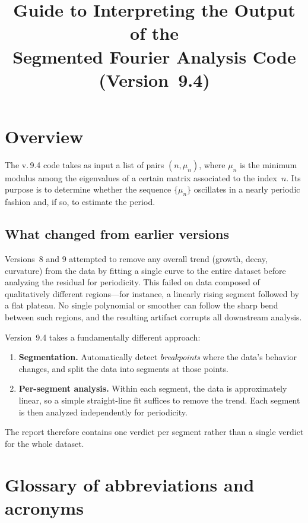 \documentclass[11pt]{article}
\title{Guide to Interpreting the Output of the\\
Segmented Fourier Analysis Code (Version~9.4)}
\author{}
\date{}
\begin{document}
\maketitle

\section{Overview}

The v.\,9.4 code takes as input a list of pairs $(n, \mu_n)$, where
$\mu_n$ is the minimum modulus among the eigenvalues of a certain matrix
associated to the index~$n$.  Its purpose is to determine whether the
sequence $\{\mu_n\}$ oscillates in a nearly periodic fashion and, if so,
to estimate the period.

\subsection*{What changed from earlier versions}

Versions~8 and 9 attempted to remove any overall trend (growth, decay,
curvature) from the data by fitting a single curve to the entire dataset
before analyzing the residual for periodicity.  This failed on data
composed of qualitatively different regions---for instance, a linearly
rising segment followed by a flat plateau.  No single polynomial or
smoother can follow the sharp bend between such regions, and the resulting
artifact corrupts all downstream analysis.

Version~9.4 takes a fundamentally different approach:
\begin{enumerate}
\item \textbf{Segmentation.}  Automatically detect \emph{breakpoints}
  where the data's behavior changes, and split the data into segments at
  those points.
\item \textbf{Per-segment analysis.}  Within each segment, the data is
  approximately linear, so a simple straight-line fit suffices to remove
  the trend.  Each segment is then analyzed independently for periodicity.
\end{enumerate}

The report therefore contains one verdict per segment rather than a single
verdict for the whole dataset.

\section{Glossary of abbreviations and acronyms}
\label{sec:glossary}
\end{document}
